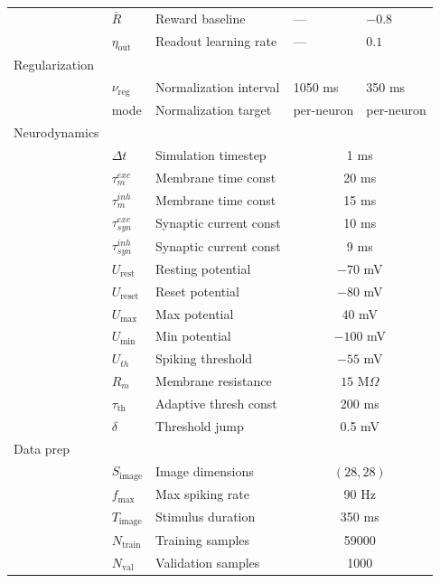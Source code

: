 \begin{longtable}{m{2.4cm}m{1.9cm}m{4.3cm}m{2.1cm}m{2.1cm}}
  & $\bar{R}$         & Reward baseline & --- & $-0.8$ \\
  & $\eta_{\text{out}}$ & Readout learning rate & --- & $0.1$ \\
Regularization    &&&&\\
  & $\nu_{\text{reg}}$ & Normalization interval & 1050 ms & 350 ms \\
  & mode              & Normalization target & per-neuron & per-neuron \\
Neurodynamics     &&&&\\
  & $\Delta t$        & Simulation timestep & \multicolumn{2}{c}{1 ms} \\
  & $\tau_m^{exc}$    & Membrane time const & \multicolumn{2}{c}{20 ms} \\
  & $\tau_m^{inh}$    & Membrane time const & \multicolumn{2}{c}{15 ms} \\
  & $\tau_{syn}^{exc}$ & Synaptic current const & \multicolumn{2}{c}{10 ms} \\
  & $\tau_{syn}^{inh}$ & Synaptic current const & \multicolumn{2}{c}{9 ms} \\
  & $U_{\text{rest}}$ & Resting potential & \multicolumn{2}{c}{$-70$ mV} \\
  & $U_{\text{reset}}$& Reset potential & \multicolumn{2}{c}{$-80$ mV} \\
  & $U_{\max}$        & Max potential & \multicolumn{2}{c}{$40$ mV} \\
  & $U_{\min}$        & Min potential & \multicolumn{2}{c}{$-100$ mV} \\
  & $U_{th}$          & Spiking threshold & \multicolumn{2}{c}{$-55$ mV} \\
  & $R_m$             & Membrane resistance & \multicolumn{2}{c}{$15$ M$\Omega$} \\
  & $\tau_{\text{th}}$ & Adaptive thresh const & \multicolumn{2}{c}{200 ms} \\
  & $\delta$          & Threshold jump & \multicolumn{2}{c}{0.5 mV} \\
Data prep   &&&&\\
  & $S_{\text{image}}$ & Image dimensions & \multicolumn{2}{c}{$(28, 28)$} \\
  & $f_{\max}$        & Max spiking rate & \multicolumn{2}{c}{90 Hz} \\
  & $T_{\text{image}}$ & Stimulus duration & \multicolumn{2}{c}{350 ms} \\
  & $N_{\text{train}}$ & Training samples & \multicolumn{2}{c}{59000} \\
  & $N_{\text{val}}$  & Validation samples & \multicolumn{2}{c}{1000} \\

\end{longtable}
